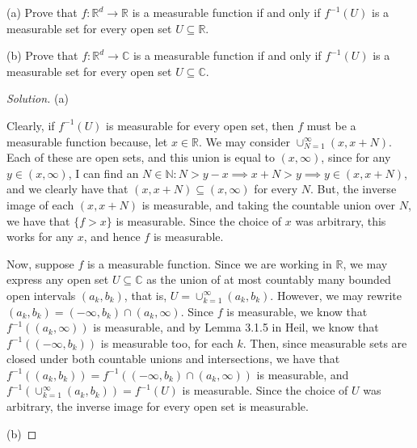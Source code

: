 \documentclass[10pt]{article}
\newenvironment{problem}[2][Problem]{\begin{trivlist}
\item[\hskip \labelsep {\bfseries #1}\hskip \labelsep {\bfseries #2.}]}{\end{trivlist}}
\begin{document}
\begin{problem}{3.1.18}

(a) Prove that $f: \mathbb{R}^d \to \mathbb{R}$ is a measurable function if and only if $f^{-1}(U)$ is a measurable set for every open set $U \subseteq \mathbb{R}$.

(b) Prove that $f: \mathbb{R}^d \to \mathbb{C}$ is a measurable function if and only if $f^{-1}(U)$ is a measurable set for every open set $U \subseteq \mathbb{C}$.
\end{problem}
\begin{proof}[Solution]

(a) 

Clearly, if $f^{-1}(U)$ is measurable for every open set, then $f$ must be a measurable function because, let $x \in \mathbb{R}$. We may consider $\cup_{N=1}^\infty (x,x+N)$. Each of these are open sets, and this union is equal to $(x,\infty)$, since for any $y \in (x,\infty)$, I can find an $N \in \mathbb{N} : N > y-x \implies x+ N > y \implies y \in (x,x+N)$, and we clearly have that $(x,x+N) \subseteq (x,\infty)$ for every $N$. But, the inverse image of each $(x,x+N)$ is measurable, and taking the countable union over $N$, we have that $\{ f > x \}$ is measurable. Since the choice of $x$ was arbitrary, this works for any $x$, and hence $f$ is measurable.

Now, suppose $f$ is a measurable function. Since we are working in $\mathbb{R}$, we may express any open set $U \subseteq \mathbb{C}$  as the union of at most countably many bounded open intervals $(a_k,b_k)$, that is, $U = \cup_{k=1}^\infty (a_k,b_k)$. However, we may rewrite $(a_k,b_k) = (-\infty,b_k) \cap (a_k,\infty)$. Since $f$ is measurable, we know that $f^{-1}((a_k,\infty))$ is measurable, and by Lemma 3.1.5 in Heil, we know that $f^{-1}((-\infty,b_k))$ is measurable too, for each $k$. Then, since measurable sets are closed under both countable unions and intersections, we have that $f^{-1}((a_k,b_k)) = f^{-1}((-\infty,b_k) \cap (a_k,\infty))$ is measurable, and  $f^{-1}(\cup_{k=1}^\infty (a_k,b_k)) = f^{-1}(U)$ is measurable. Since the choice of $U$ was arbitrary, the inverse image for every open set is measurable.

(b)


\end{proof}
\end{document}
